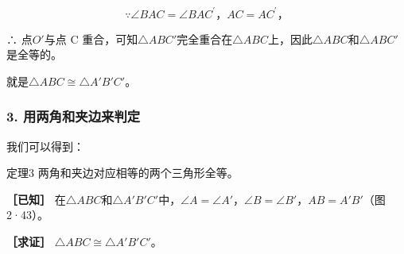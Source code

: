 \[
\because \angle BAC = \angle BAC ^{\prime}\text{，} AC = AC ^{\prime}\text{，}
\]

∴ 点\(O'\)与点 C
重合，可知\(\triangle ABC'\)完全重合在\(\triangle ABC\)上，因此\(\triangle ABC\)和\(\triangle ABC'\)是全等的。

就是\(\triangle ABC \cong \triangle A'B'C'\)。

\subsubsection{3.
用两角和夹边来判定}

我们可以得到：

定理3 两角和夹边对应相等的两个三角形全等。

\textbf{［已知］}
在\(\triangle ABC\)和\(\triangle A'B'C'\)中，\(\angle A = \angle A'\)，\(\angle B = \angle B'\)，\(AB = A'B'\)（图
2·43）。

\textbf{［求证］} \(\triangle ABC \cong \triangle A'B'C'\)。

